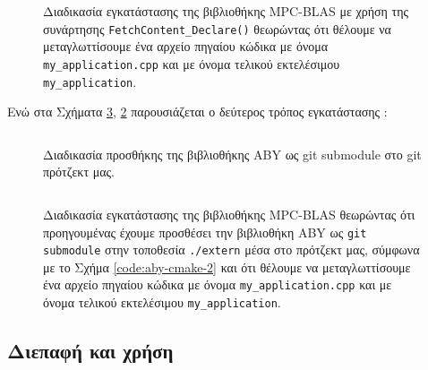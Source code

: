 \begin{figure}[h!]
    \begin{center}
        \inputminted[fontsize=\scriptsize,frame=single]{cpp}{./01_body/code/mpc-blas-1.cmake}
    \end{center}
    \caption[Διαδικασία εγκατάστασης της βιβλιοθήκης MPC-BLAS με χρήση της συνάρτησης \texttt{FetchContent_Declare()}]{Διαδικασία εγκατάστασης της βιβλιοθήκης MPC-BLAS με χρήση της συνάρτησης \texttt{FetchContent_Declare()} θεωρώντας ότι θέλουμε να μεταγλωττίσουμε ένα αρχείο πηγαίου κώδικα με όνομα \texttt{my_application.cpp} και με όνομα τελικού εκτελέσιμου \texttt{my_application}.}
    \label{code:mpc-blas-1.cmake}
\end{figure}

Ενώ στα Σχήματα \ref{code:mpc-blas-2.cmake}, \ref{code:mpc-blas-installation} παρουσιάζεται ο δεύτερος τρόπος εγκατάστασης :

\begin{figure}[h!]
    \begin{center}
        \inputminted[fontsize=\scriptsize,frame=single]{cpp}{./01_body/code/mpc-blas-installation.sh}
    \end{center}
    \caption{Διαδικασία προσθήκης της βιβλιοθήκης ABY ως git submodule στο git πρότζεκτ μας.}
    \label{code:mpc-blas-installation}
\end{figure}

\begin{figure}[h!]
    \begin{center}
        \inputminted[fontsize=\scriptsize,frame=single]{cpp}{./01_body/code/mpc-blas-2.cmake}
    \end{center}
    \caption[Διαδικασία εγκατάστασης της βιβλιοθήκης με χρήση \texttt{git submodule}]{Διαδικασία εγκατάστασης της βιβλιοθήκης MPC-BLAS θεωρώντας ότι προηγουμένας έχουμε προσθέσει την βιβλιοθήκη ABY ως \texttt{git submodule} στην τοποθεσία \texttt{./extern} μέσα στο πρότζεκτ μας, σύμφωνα με το Σχήμα \ref{code:aby-cmake-2} και ότι θέλουμε να μεταγλωττίσουμε ένα αρχείο πηγαίου κώδικα με όνομα \texttt{my_application.cpp} και με όνομα τελικού εκτελέσιμου \texttt{my_application}.}
    \label{code:mpc-blas-2.cmake}
\end{figure}

\subsection{Διεπαφή και χρήση}

